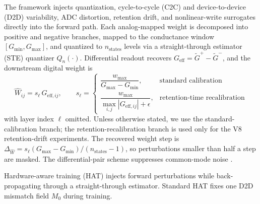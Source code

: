 The framework injects quantization, cycle-to-cycle (C2C) and device-to-device (D2D) variability, ADC distortion, retention drift, and nonlinear-write surrogates directly into the forward path. Each analog-mapped weight is decomposed into positive and negative branches, mapped to the conductance window $[G_{\min}, G_{\max}]$, and quantized to $n_{\mathrm{states}}$ levels via a straight-through estimator (STE) quantizer $Q_{n}(\cdot)$. Differential readout recovers $G_{\mathrm{eff}}=\tilde{G}^{+}-\tilde{G}^{-}$, and the downstream digital weight is
\begin{equation}
    \hat{W}_{ij}=s_{\ell}\,G_{\mathrm{eff},ij},
    \qquad
    s_{\ell}=
    \begin{cases}
        \dfrac{w_{\max}}{G_{\max}-G_{\min}}, & \text{standard calibration} \\[6pt]
        \dfrac{w_{\max}}{\max_{i,j}|G_{\mathrm{eff},ij}|+\epsilon}, & \text{retention-time recalibration}
    \end{cases}
\label{eq:scale-recovery}
\end{equation}
with layer index $\ell$ omitted. Unless otherwise stated, we use the standard-calibration branch; the retention-recalibration branch is used only for the V8 retention-drift experiments. The recovered weight step is $\Delta_{\hat{W}}=s_{\ell}(G_{\max}-G_{\min})/(n_{\mathrm{states}}-1)$, so perturbations smaller than half a step are masked. The differential-pair scheme suppresses common-mode noise \citep{wei2020voltagedifferential,kim2024sttmram}.

Hardware-aware training (HAT) injects forward perturbations while back-propagating through a straight-through estimator. Standard HAT fixes one D2D mismatch field $M_{0}$ during training.
